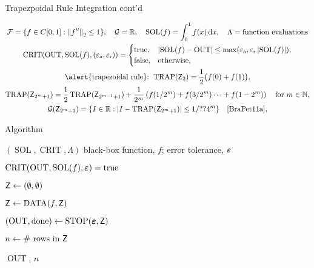 \documentclass[10pt,compress,xcolor={usenames,dvipsnames},aspectratio=169]{beamer}
\DeclareMathOperator{\TRAP}{TRAP}
\DeclareMathOperator{\STOP}{STOP}
\DeclareMathOperator{\DATA}{DATA}
\DeclareMathOperator{\SOL}{SOL}
\DeclareMathOperator{\OUT}{OUT}
\DeclareMathOperator{\CRIT}{CRIT}
\newcommand{\ttrue}{\text{true}}
\newcommand{\tfalse}{\text{false}}
\newcommand{\tolabs}{\varepsilon_{\text{a}}}
\newcommand{\tolrel}{\varepsilon_{\text{r}}}
\begin{document}
\begin{frame}{Trapezpoidal Rule Integration cont'd}

\vspace{-2ex}
\begin{gather*}
	\cf = \{f \in C[0,1] : \norm[2]{f''} \le 1\}, \quad 
	\cg  = \reals,  \quad
	\SOL(f) = \int_0^1 f(x) \, \dif x, \quad   \Lambda = \text{function evaluations} \\
	\CRIT(\OUT, \SOL(f),(\tolabs, \tolrel))  = \begin{cases} \ttrue, & \abs{\SOL(f) - \OUT} \le \max(\tolabs,\tolrel \abs{\SOL(f)}), \\
		\tfalse, & \text{otherwise},
		\end{cases} \\
		\text{\alert{trapezoidal rule}: } 
		\TRAP(\mZ_2) = \frac 1{2} \bigl( f(0) + f(1) \bigr), \\  \TRAP(\mZ_{2^m+1}) = \frac {1}{2}\TRAP(\mZ_{2^{m-1}+1}) + \frac 1{2^m} \left( f(1/2^m) + f(3/2^m) \cdots + f(1 - 2^m) \right)  \quad \text{for } m \in \naturals,\\
		\cg(\mZ_{2^m+1}) = \{I \in \reals : \abs{I - \TRAP(\mZ_{2^m+1})} \le 1/??4^m\} \quad \text{\cite[(7.??)]{BraPet11a}}, \\ 
\end{gather*}


\end{frame}



\begin{frame}{Algorithm}
	
\vspace{-2ex}
\begin{algorithm}[H]
	\renewcommand{\thealgorithm}{}
	\caption{General Algorithm Pattern}
	\begin{algorithmic}
		\PROB $(\SOL, \CRIT,\Lambda)$
		\INPUT black-box function, $f$;  error tolerance, $\boldsymbol{\varepsilon}$
		
		\Ensure  $\CRIT(\OUT,\SOL(f),\veps) = \ttrue$
		
		\State $\mathsf{Z} \leftarrow (\emptyset, \emptyset)$
				
		\Repeat 
		
		\State $\mZ \leftarrow \DATA(f,\mZ)$

		\State $(\OUT,\text{done}) \leftarrow \STOP(\veps,\mZ)$
				
		\Until{$\text{done} = \ttrue$}
		
		\State $n  \leftarrow \text{\# rows in } \mathsf{Z}$
		
		\RETURN $\OUT$, $n$
	\end{algorithmic}
\end{algorithm}	
\end{frame}

\printbibliography
\end{document}
